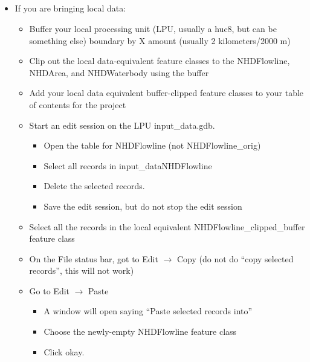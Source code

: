 \documentclass[letterpaper,10pt,english]{sphinxmanual}
\begin{document}
\subparagraph{}
\label{\detokenize{ex_1:byod-streamline-editing-instructions}}\begin{itemize}
\item {} 
If you are bringing local data:
\begin{itemize}
\item {} 
Buffer your local processing unit (LPU, usually a huc8, but can be something else) boundary by X amount (usually 2 kilometers/2000 m)

\item {} 
Clip out the local data-equivalent feature classes to the NHDFlowline, NHDArea, and NHDWaterbody using the buffer

\item {} 
Add your local data equivalent buffer-clipped feature classes to your table of contents for the project

\item {} 
Start an edit session on the LPU input\_data.gdb.
\begin{itemize}
\item {} 
Open the table for NHDFlowline (not NHDFlowline\_orig)

\item {} 
Select all records in input\_dataNHDFlowline

\item {} 
Delete the selected records.

\item {} 
Save the edit session, but do not stop the edit session

\end{itemize}

\item {} 
Select all the records in the local equivalent NHDFlowline\_clipped\_buffer feature class

\item {} 
On the File status bar, got to Edit \(\rightarrow\) Copy (do not do “copy selected records”, this will not work)

\item {} 
Go to Edit \(\rightarrow\) Paste
\begin{itemize}
\item {} 
A window will open saying “Paste selected records into”

\item {} 
Choose the newly-empty NHDFlowline feature class

\item {} 
Click okay.


\end{itemize}
\end{itemize}
\end{itemize}
\end{document}
